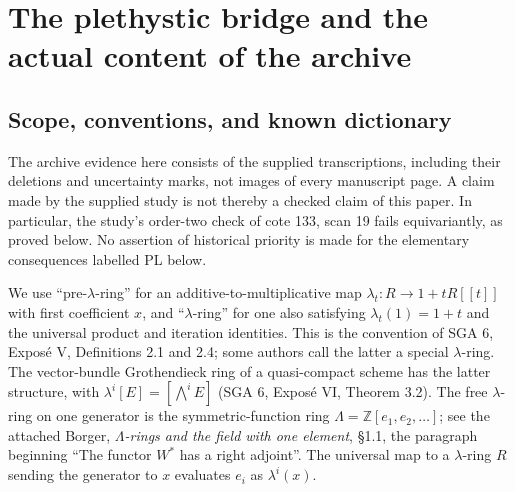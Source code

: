\section{The plethystic bridge and the actual content of the archive}
\label{sec:plethysm-bridge}

\subsection{Scope, conventions, and known dictionary}
The archive evidence here consists of the supplied transcriptions, including their
deletions and uncertainty marks, not images of every manuscript page. A claim made
by the supplied study is not thereby a checked claim of this paper. In particular,
the study's order-two check of cote 133, scan 19 fails equivariantly, as proved
below. No assertion of historical priority is made for the elementary consequences
labelled PL below.

We use ``pre-$\lambda$-ring'' for an additive-to-multiplicative map
$\lambda_t:R\longrightarrow 1+tR[[t]]$ with first coefficient $x$, and
``$\lambda$-ring'' for one also satisfying $\lambda_t(1)=1+t$ and the
universal product and iteration identities. This is the convention of SGA 6, Expos\'e V,
Definitions 2.1 and 2.4; some authors call the latter a special $\lambda$-ring.
The vector-bundle Grothendieck ring of a quasi-compact scheme has the latter
structure, with $\lambda^i[E]=[\bigwedge^iE]$ (SGA 6, Expos\'e VI,
Theorem 3.2). The free $\lambda$-ring on one generator is the symmetric-function
ring $\Lambda=\mathbb Z[e_1,e_2,\ldots]$; see the attached Borger,
\emph{$\Lambda$-rings and the field with one element}, \S1.1, the paragraph
beginning ``The functor $W^*$ has a right adjoint''. The universal map to a
$\lambda$-ring $R$ sending the generator to $x$ evaluates $e_i$ as $\lambda^i(x)$.


